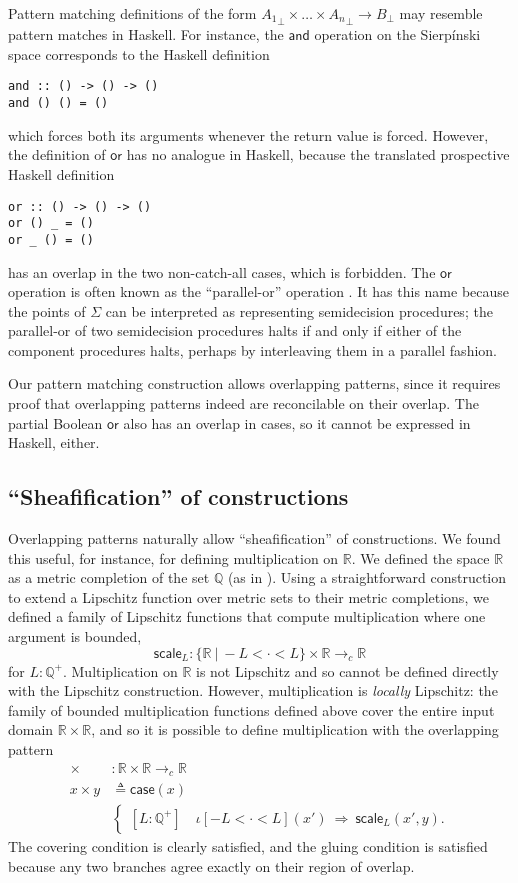 \documentclass[conference]{IEEEtran}
\newcommand{\cto}{\to_c}
\newcommand{\R}{\mathbb{R}}
\newcommand{\rat}{\mathbb{Q}}
\newcommand{\suchthat}{\ |\ }
\newcommand{\oinclf}[1]{\iota[{#1}]}
\newcommand{\oincl}[2]{\oinclf{#1} \left({#2}\right)}
\newcommand{\Branch}{\Rightarrow}
\newcommand{\grammar}[1]{\textcolor{red}{\underline{#1}}}
\renewcommand{\grammar}[1]{#1}
\begin{document}
Pattern matching definitions of the form ${A_1}_\bot \times \ldots \times {A_n}_\bot \to B_\bot$ may resemble pattern matches in Haskell. For instance, the $\mathsf{and}$ operation on the Sierp\'inski space corresponds to the Haskell definition
\begin{Verbatim}[samepage=true]
and :: () -> () -> ()
and () () = ()
\end{Verbatim}
which forces both its arguments whenever the return value is forced. However, the definition of $\mathsf{or}$ has no analogue in Haskell, because the translated prospective Haskell definition
\begin{Verbatim}[samepage=true]
or :: () -> () -> ()
or () _ = ()
or _ () = ()
\end{Verbatim}
has an overlap in the two non-catch-all cases, which is forbidden.
The $\mathsf{or}$ operation is often known as the ``parallel-or'' operation \cite{escardo2004}. It has this name because the points of $\Sigma$ can be interpreted as representing semidecision procedures; the parallel-or of two semidecision procedures halts if and only if either of the component procedures halts, perhaps by interleaving them in a parallel fashion.

Our pattern matching construction allows overlapping patterns, since it requires proof that overlapping patterns indeed are reconcilable on their overlap. The partial Boolean $\mathsf{or}$ also has an overlap  in cases, so it cannot be expressed in Haskell, either.

\subsection{``Sheafification'' of constructions}
\label{s:ex:sheaf}

Overlapping patterns naturally allow ``sheafification'' of constructions. We found \grammar{this} useful, for instance, for defining multiplication on $\R$. We defined the space $\R$ as a metric completion of the set $\rat$ (as in \cite{vickersmetric}). Using a straightforward construction to extend a Lipschitz function over metric sets to their metric completions, we defined a family of Lipschitz functions that compute multiplication where one argument is bounded,
\[
\mathsf{scale}_L : \{ \R \suchthat -L < \cdot < L \} \times \R \cto \R
\]
for $L : \rat^+$. Multiplication on $\R$ is not Lipschitz and so cannot be defined directly with the Lipschitz construction. However, multiplication is \emph{locally} Lipschitz: the family of bounded multiplication functions defined above cover the entire input domain $\R \times \R$, and so it is possible to define multiplication with the overlapping pattern
\begin{align*}
\times &: \R \times \R \cto \R
\\ x \times y &\triangleq
\mathsf{case}(x)
\\
&\begin{cases}
[L : \rat^+] \quad \oincl{-L < \cdot < L}{x'}  \  \Branch \  \mathsf{scale}_L(x', y).
\end{cases}
\end{align*}
The covering condition is clearly satisfied, and the gluing condition is satisfied because any two branches agree exactly on their region of overlap.
\end{document}
